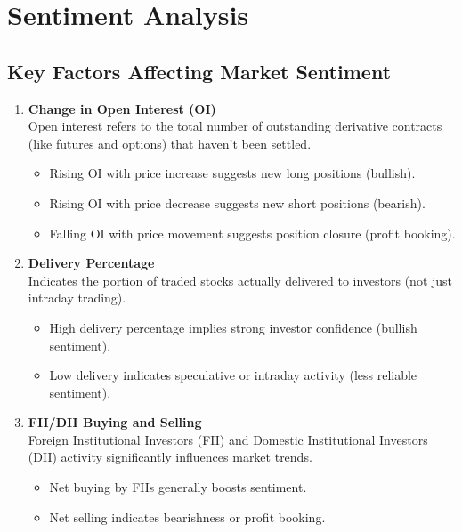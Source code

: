 \documentclass[12pt]{article}
\begin{document}
\section{Sentiment Analysis}

\subsection{Key Factors Affecting Market Sentiment}

\begin{enumerate}
    \item \textbf{Change in Open Interest (OI)}\\
    Open interest refers to the total number of outstanding derivative contracts (like futures and options) that haven't been settled.
    \begin{itemize}
        \item Rising OI with price increase suggests new long positions (bullish).
        \item Rising OI with price decrease suggests new short positions (bearish).
        \item Falling OI with price movement suggests position closure (profit booking).
    \end{itemize}

    \item \textbf{Delivery Percentage}\\
    Indicates the portion of traded stocks actually delivered to investors (not just intraday trading).
    \begin{itemize}
        \item High delivery percentage implies strong investor confidence (bullish sentiment).
        \item Low delivery indicates speculative or intraday activity (less reliable sentiment).
    \end{itemize}

    \item \textbf{FII/DII Buying and Selling}\\
    Foreign Institutional Investors (FII) and Domestic Institutional Investors (DII) activity significantly influences market trends.
    \begin{itemize}
        \item Net buying by FIIs generally boosts sentiment.
        \item Net selling indicates bearishness or profit booking.
    \end{itemize}


\end{enumerate}
\end{document}
